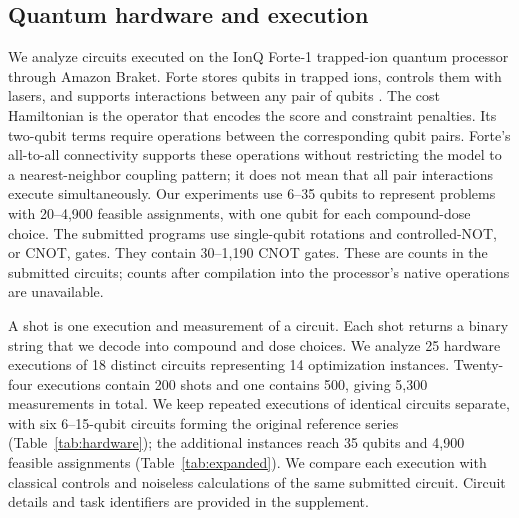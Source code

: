 \documentclass[utf8]{FrontiersinHarvard}
\begin{document}
\subsection{Quantum hardware and execution}
We analyze circuits executed on the IonQ Forte-1 trapped-ion quantum processor through Amazon Braket. Forte stores qubits in trapped ions, controls them with lasers, and supports interactions between any pair of qubits \citep{chen2024}. The cost Hamiltonian is the operator that encodes the score and constraint penalties. Its two-qubit terms require operations between the corresponding qubit pairs. Forte's all-to-all connectivity supports these operations without restricting the model to a nearest-neighbor coupling pattern; it does not mean that all pair interactions execute simultaneously. Our experiments use 6--35 qubits to represent problems with 20--4,900 feasible assignments, with one qubit for each compound-dose choice. The submitted programs use single-qubit rotations and controlled-NOT, or CNOT, gates. They contain 30--1,190 CNOT gates. These are counts in the submitted circuits; counts after compilation into the processor's native operations are unavailable.

A shot is one execution and measurement of a circuit. Each shot returns a binary string that we decode into compound and dose choices. We analyze 25 hardware executions of 18 distinct circuits representing 14 optimization instances. Twenty-four executions contain 200 shots and one contains 500, giving 5,300 measurements in total. We keep repeated executions of identical circuits separate, with six 6--15-qubit circuits forming the original reference series (Table~\ref{tab:hardware}); the additional instances reach 35 qubits and 4,900 feasible assignments (Table~\ref{tab:expanded}). We compare each execution with classical controls and noiseless calculations of the same submitted circuit. Circuit details and task identifiers are provided in the supplement.
\end{document}
